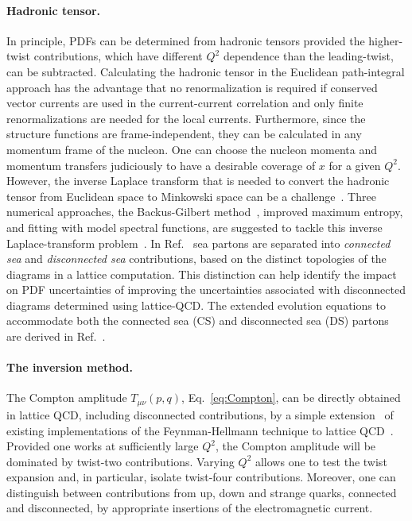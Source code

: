 \paragraph*{Hadronic tensor.} 
In principle, PDFs can be determined from hadronic tensors provided the 
higher-twist contributions, which have different $Q^2$ dependence than the 
leading-twist, can be subtracted. 
%
Calculating the hadronic tensor in the Euclidean path-integral approach
has the advantage that no renormalization is required if conserved vector      
currents are used in the current-current correlation and only finite 
renormalizations are needed for the local currents.
%
Furthermore, since the structure functions are frame-independent, they 
can be calculated in any momentum frame of the nucleon. 
%
One can choose the nucleon momenta and momentum transfers judiciously 
to have a desirable coverage of $x$ for a given $Q^2$. 
%
However, the inverse Laplace transform that is needed to convert the hadronic tensor from Euclidean space to Minkowski space can be a 
challenge~\cite{Liu:1993cv,Liu:1999ak}. 
%
Three numerical approaches, the Backus-Gilbert method~\cite{Hansen:2017mnd}, 
improved maximum entropy, and fitting with model spectral functions, 
are suggested to tackle this inverse Laplace-transform 
problem~\cite{Liu:2016djw}. 
%
In Ref.~\cite{Liu:1993cv} sea partons are separated into {\it connected sea} 
and {\it disconnected sea} contributions, based on the distinct topologies of 
the diagrams in a lattice computation. 
%
This distinction can help identify the impact on PDF uncertainties of 
improving the uncertainties associated with disconnected diagrams determined 
using lattice-QCD.
%
The extended evolution equations to accommodate both the connected sea 
(CS) and disconnected sea (DS) partons are derived in Ref.~\cite{Liu:2017lpe}.

\paragraph*{The inversion method.} 
\label{Sec:InversionMethod}

The Compton amplitude $T_{\mu\nu}(p,q)$, Eq.~\eqref{eq:Compton}, can be
directly obtained in lattice QCD, including disconnected contributions,  
by a simple extension~\cite{Chambers:2017dov} of existing implementations of 
the Feynman-Hellmann technique to lattice QCD~\cite{Horsley:2012pz,
Chambers:2014qaa,Chambers:2015bka}.
%
Provided one works at sufficiently large $Q^2$, the Compton amplitude will be 
dominated by twist-two contributions.
%
Varying $Q^2$ allows one to test the twist expansion and, in particular, 
isolate twist-four contributions. Moreover, one can distinguish between 
contributions from up, down and strange quarks, connected and disconnected, 
by appropriate insertions of the electromagnetic current.

